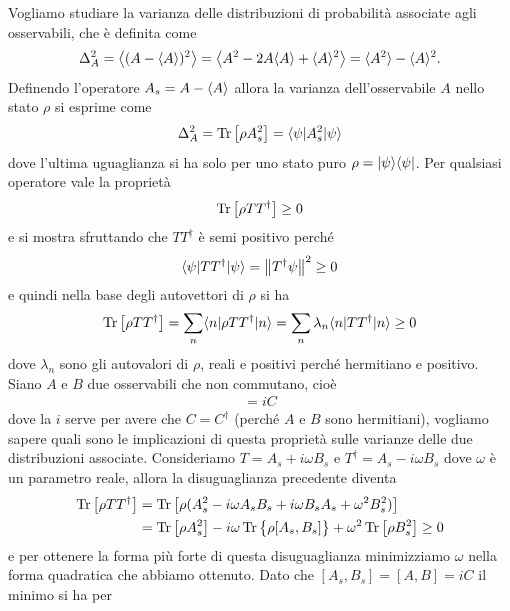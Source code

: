 Vogliamo studiare la varianza delle distribuzioni di probabilità associate agli osservabili, che è definita come 
\begin{align*}
  \Delta_A^2 = \sca{ (A - \sc{A})^2 } = \sca{ A^2 - 2A \sc{A} + \sc{A}^2 } = \sc{A^2} - \sc{A}^2.
\end{align*}
Definendo l'operatore $ A_s = A - \sc{A} $ allora la varianza dell'osservabile $ A $ nello stato $ \rho $ si esprime come 
\begin{align*}
  \Delta_A^2 = \Tr\left[ \rho A_s^2\right] = \bk{\psi | A_s^2 |\psi}
\end{align*}
dove l'ultima uguaglianza si ha solo per uno stato puro $ \rho = \k{\psi} \b{\psi} $. Per qualsiasi operatore vale la proprietà 
\begin{align*}
  \Tr\left[ \rho T T^\dag \right] \geq 0
\end{align*}
e si mostra sfruttando che $ TT^\dag $ è semi positivo perché
\begin{align*}
  \bk{\psi | TT^\dag | \psi} = \norm{T^\dag \psi}^2 \geq 0
\end{align*}
e quindi nella base degli autovettori di $ \rho $ si ha
\begin{align*}
  \Tr\left[ \rho TT^\dag \right] = \sum_{n} \bk{n | \rho TT^\dag | n} = \sum_n \lambda_n \bk{n | TT^\dag | n}  \geq 0
\end{align*}
dove $ \lambda_n $ sono gli autovalori di $ \rho $, reali e positivi perché hermitiano e positivo. 
Siano $ A $ e $ B $ due osservabili che non commutano, cioè 
\begin{align*}
  [A,B] = i C
\end{align*}
dove la $ i $ serve per avere che $ C = C^\dag $ (perché $ A $ e $ B $ sono hermitiani), vogliamo sapere quali sono le implicazioni di questa proprietà 
sulle varianze delle due distribuzioni associate. Consideriamo $ T = A_s + i \omega B_s $ e $ T^\dag = A_s - i\omega B_s $ dove $ \omega $ è un parametro 
reale, allora la disuguaglianza precedente diventa 
\begin{align*}
  \Tr\left[ \rho TT^\dag \right] &= \Tr\left[ \rho (A_s^2 - i\omega A_s B_s + i \omega B_s A_s + \omega^2 B_s^2) \right] 
  \\
  &= \Tr\left[ \rho A_s^2 \right] - i \omega \Tr \left\{ \phb\rho [A_s,B_s] \right\} + \omega^2 \Tr\left[ \rho B_s^2 \right] \geq 0
\end{align*}
e per ottenere la forma più forte di questa disuguaglianza minimizziamo $ \omega $ nella forma quadratica che abbiamo ottenuto. Dato che 
$ [A_s, B_s] = [A, B] = i C $ il minimo si ha per 
